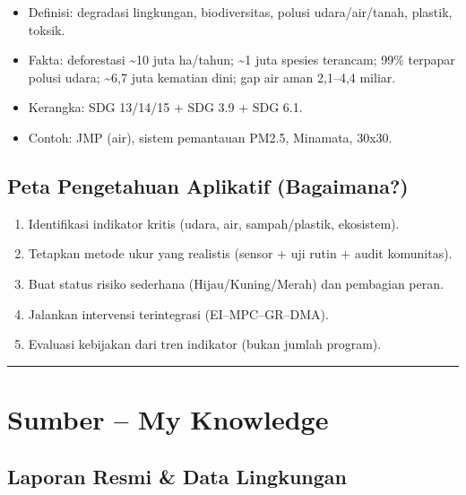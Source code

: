 \documentclass[
  letterpaper,
  DIV=11,
  numbers=noendperiod]{scrreprt}
\providecommand{\tightlist}{%
  \setlength{\itemsep}{0pt}\setlength{\parskip}{0pt}}
\begin{document}
\begin{itemize}
\tightlist
\item
  Definisi: degradasi lingkungan, biodiversitas, polusi udara/air/tanah,
  plastik, toksik.\\
\item
  Fakta: deforestasi \textasciitilde10 juta ha/tahun; \textasciitilde1
  juta spesies terancam; 99\% terpapar polusi udara; \textasciitilde6,7
  juta kematian dini; gap air aman 2,1--4,4 miliar.\\
\item
  Kerangka: SDG 13/14/15 + SDG 3.9 + SDG 6.1.\\
\item
  Contoh: JMP (air), sistem pemantauan PM2.5, Minamata, 30x30.
\end{itemize}

\subsection{Peta Pengetahuan Aplikatif
(Bagaimana?)}\label{peta-pengetahuan-aplikatif-bagaimana}

\begin{enumerate}
\def\labelenumi{\arabic{enumi})}
\tightlist
\item
  Identifikasi indikator kritis (udara, air, sampah/plastik,
  ekosistem).\\
\item
  Tetapkan metode ukur yang realistis (sensor + uji rutin + audit
  komunitas).\\
\item
  Buat status risiko sederhana (Hijau/Kuning/Merah) dan pembagian
  peran.\\
\item
  Jalankan intervensi terintegrasi (EI--MPC--GR--DMA).\\
\item
  Evaluasi kebijakan dari tren indikator (bukan jumlah program).
\end{enumerate}

\begin{center}\rule{0.5\linewidth}{0.5pt}\end{center}

\section{Sumber -- My Knowledge}\label{sumber-my-knowledge}

\subsection{Laporan Resmi \& Data
Lingkungan}\label{laporan-resmi-data-lingkungan}
\end{document}
